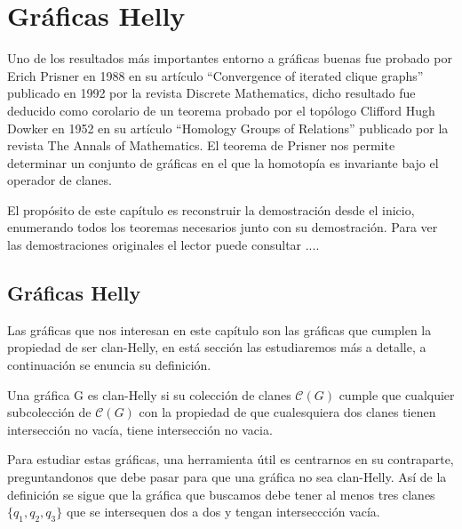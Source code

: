 \chapter{Gráficas Helly}
Uno de los resultados más importantes entorno a gráficas buenas fue probado por Erich Prisner en 1988 en su artículo ``Convergence of iterated clique graphs'' publicado en 1992 por la revista Discrete Mathematics, dicho resultado fue deducido como corolario de un teorema probado por el topólogo Clifford Hugh Dowker en 1952 en su artículo ``Homology Groups of Relations'' publicado por la revista The Annals of Mathematics.
El teorema de Prisner nos permite determinar un conjunto de gráficas en el que la homotopía es invariante bajo el operador de clanes.

El propósito de este capítulo es reconstruir la demostración desde el inicio, enumerando todos los teoremas necesarios junto con su demostración. Para ver las demostraciones originales el lector puede consultar ....

\section{Gráficas Helly}
Las gráficas que nos interesan en este capítulo son las gráficas que cumplen la propiedad de ser clan-Helly, en está sección las estudiaremos más a detalle, a continuación se enuncia su definición.
\begin{Defi}
Una gráfica G es clan-Helly si su colección de clanes $\mathcal{C}(G)$ cumple que cualquier subcolección de $\mathcal{C}(G)$ con la propiedad de que cualesquiera dos clanes tienen intersección no vacía, tiene intersección no vacia.  
\end{Defi}

Para estudiar estas gráficas, una herramienta útil es centrarnos en su contraparte, preguntandonos que debe pasar para que una gráfica no sea clan-Helly. Así de la definición se sigue que la gráfica que buscamos debe tener al menos tres clanes $\{q_1,q_2,q_3\}$ que se intersequen dos a dos y tengan interseccción vacía.


